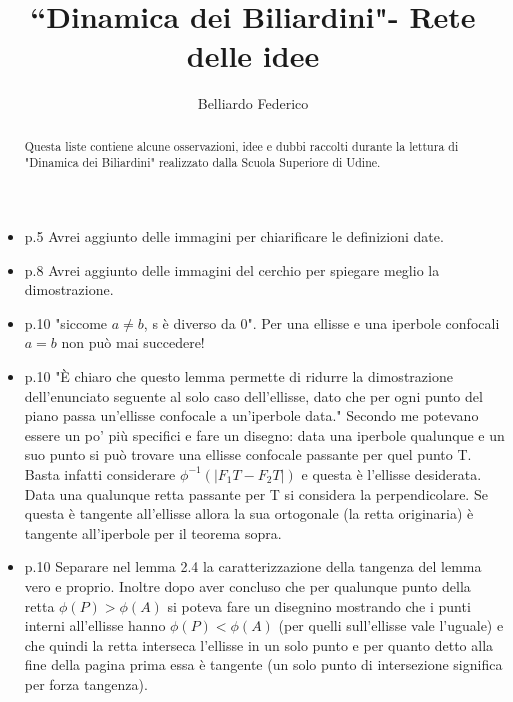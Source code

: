 \documentclass[10pt,a4paper]{article}
\author{Belliardo Federico}
\title{``Dinamica dei Biliardini"- Rete delle idee}
\begin{document}
\maketitle


\begin{abstract}

Questa liste contiene alcune osservazioni, idee e dubbi raccolti durante la lettura di "Dinamica dei Biliardini" realizzato dalla Scuola Superiore di Udine.

\end{abstract}


\begin{itemize}

\item p.5 Avrei aggiunto delle immagini per chiarificare le definizioni date.

\item p.8 Avrei aggiunto delle immagini del cerchio per spiegare meglio la dimostrazione.

\item p.10 "siccome $a \neq b$, s è diverso da 0". Per una ellisse e una iperbole confocali $a = b$ non può mai succedere!

\item p.10 "È chiaro che questo lemma permette di ridurre la dimostrazione dell’enunciato seguente al solo caso dell'ellisse, dato che per ogni punto del piano passa un’ellisse confocale a un’iperbole data." Secondo me potevano essere un po' più specifici e fare un disegno: data una iperbole qualunque e un suo punto si può trovare una ellisse confocale passante per quel punto T. Basta infatti considerare $\phi^{-1} (|F_1 T - F_2 T|)$ e questa è l'ellisse desiderata. Data una qualunque retta passante per T si considera la perpendicolare. Se questa è tangente all'ellisse allora la sua ortogonale (la retta originaria) è tangente all'iperbole per il teorema sopra.

\item p.10 Separare nel lemma 2.4 la caratterizzazione della tangenza del lemma vero e proprio. Inoltre dopo aver concluso che per qualunque punto della retta $\phi (P) > \phi (A)$ si poteva fare un disegnino mostrando che i punti interni all'ellisse hanno $\phi (P) < \phi (A)$ (per quelli sull'ellisse vale l'uguale) e che quindi la retta interseca l'ellisse in un solo punto e per quanto detto alla fine della pagina prima essa è tangente (un solo punto di intersezione significa per forza tangenza).


\end{itemize}
\end{document}
